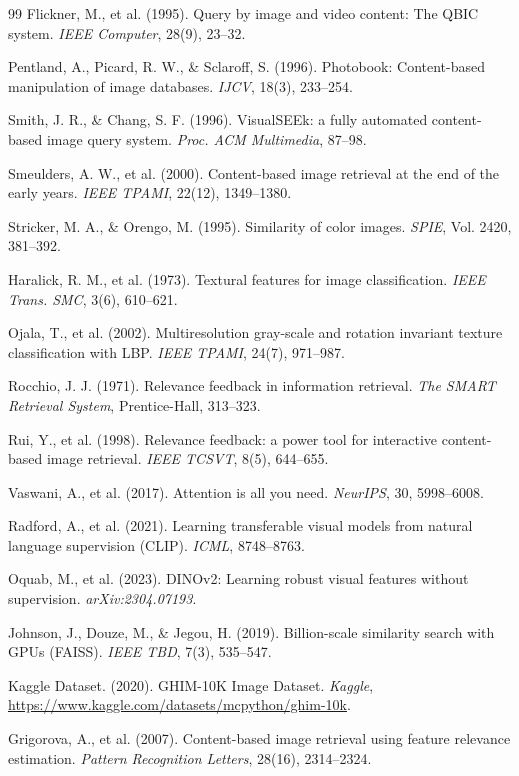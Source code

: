 \begin{thebibliography}{99}
\small
{}
Flickner, M., et al. (1995). Query by image and video content: The QBIC system. \textit{IEEE Computer}, 28(9), 23--32.

Pentland, A., Picard, R. W., \& Sclaroff, S. (1996). Photobook: Content-based manipulation of image databases. \textit{IJCV}, 18(3), 233--254.

Smith, J. R., \& Chang, S. F. (1996). VisualSEEk: a fully automated content-based image query system. \textit{Proc. ACM Multimedia}, 87--98.

Smeulders, A. W., et al. (2000). Content-based image retrieval at the end of the early years. \textit{IEEE TPAMI}, 22(12), 1349--1380.

Stricker, M. A., \& Orengo, M. (1995). Similarity of color images. \textit{SPIE}, Vol. 2420, 381--392.

Haralick, R. M., et al. (1973). Textural features for image classification. \textit{IEEE Trans. SMC}, 3(6), 610--621.

Ojala, T., et al. (2002). Multiresolution gray-scale and rotation invariant texture classification with LBP. \textit{IEEE TPAMI}, 24(7), 971--987.

Rocchio, J. J. (1971). Relevance feedback in information retrieval. \textit{The SMART Retrieval System}, Prentice-Hall, 313--323.

Rui, Y., et al. (1998). Relevance feedback: a power tool for interactive content-based image retrieval. \textit{IEEE TCSVT}, 8(5), 644--655.

Vaswani, A., et al. (2017). Attention is all you need. \textit{NeurIPS}, 30, 5998--6008.

Radford, A., et al. (2021). Learning transferable visual models from natural language supervision (CLIP). \textit{ICML}, 8748--8763.

Oquab, M., et al. (2023). DINOv2: Learning robust visual features without supervision. \textit{arXiv:2304.07193}.

Johnson, J., Douze, M., \& Jegou, H. (2019). Billion-scale similarity search with GPUs (FAISS). \textit{IEEE TBD}, 7(3), 535--547.

Kaggle Dataset. (2020). GHIM-10K Image Dataset. \textit{Kaggle}, \url{https://www.kaggle.com/datasets/mcpython/ghim-10k}.

Grigorova, A., et al. (2007). Content-based image retrieval using feature relevance estimation. \textit{Pattern Recognition Letters}, 28(16), 2314--2324.

\end{thebibliography}
